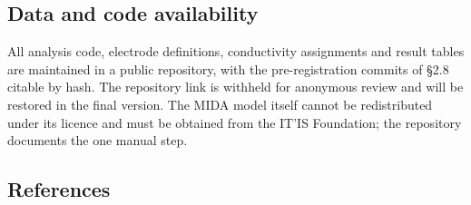 \documentclass[manuscript,review,anonymous]{acmart}
\begin{document}
\FloatBarrier
\subsection{Data and code availability}\label{data-and-code-availability}

All analysis code, electrode definitions, conductivity assignments and result
tables are maintained in a public repository, with the pre-registration commits
of \S{}2.8 citable by hash. The repository link is withheld for anonymous review
and will be restored in the final version. The MIDA model itself cannot be
redistributed under its licence and must be obtained from the IT'IS Foundation;
the repository documents the one manual step.

\FloatBarrier
\subsection{References}\label{references}
\end{document}
